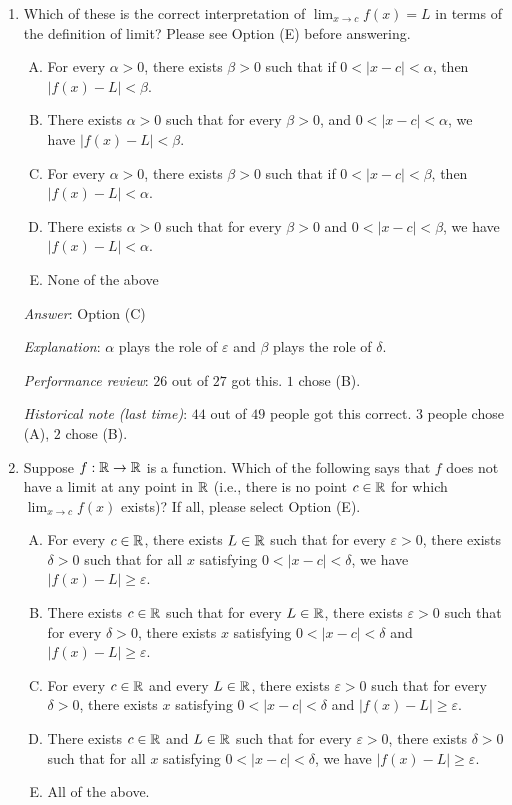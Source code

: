 \documentclass[10pt]{amsart}
\begin{document}
\begin{enumerate}
\item Which of these is the correct interpretation of $\displaystyle
  \lim_{x \to c} f(x) = L$ in terms of the definition of limit? Please
  see Option (E) before answering.

  \begin{enumerate}[(A)]
  \item For every $\alpha > 0$, there exists $\beta > 0$ such that if
    $0 < |x - c| < \alpha$, then $|f(x) - L| < \beta$.
  \item There exists $\alpha > 0$ such that for every $\beta > 0$, and
    $0 < |x - c| < \alpha$, we have $|f(x) - L| < \beta$.
  \item For every $\alpha > 0$, there exists $\beta > 0$ such that if
    $0 < |x - c| < \beta$, then $|f(x) - L| < \alpha$.
  \item There exists $\alpha > 0$ such that for every $\beta > 0$ and
    $0 < |x - c| < \beta$, we have $|f(x) - L| < \alpha$.
  \item None of the above
  \end{enumerate}

  {\em Answer}: Option (C)

  {\em Explanation}: $\alpha$ plays the role of $\varepsilon$ and $\beta$
  plays the role of $\delta$.

  {\em Performance review}: $26$ out of $27$ got this. $1$ chose (B).

  {\em Historical note (last time)}: $44$ out of $49$ people got this
  correct. $3$ people chose (A), $2$ chose (B).

\item Suppose $f:\mathbb{R} \to \mathbb{R}$ is a function. Which of the following says
  that $f$ does not have a limit at any point in $\mathbb{R}$ (i.e., there is
  no point $c \in \mathbb{R}$ for which $\displaystyle \lim_{x \to c} f(x)$
  exists)? If all, please select Option (E).

  \begin{enumerate}[(A)]
  \item For every $c \in \mathbb{R}$, there exists $L \in \mathbb{R}$ such that for
    every $\varepsilon > 0$, there exists $\delta > 0$ such that for all
    $x$ satisfying $0 < |x - c| < \delta$, we have $|f(x) - L| \ge
    \varepsilon$.
  \item There exists $c \in \mathbb{R}$ such that for every $L \in \mathbb{R}$, there
    exists $\varepsilon > 0$ such that for every $\delta > 0$, there exists
    $x$ satisfying $0 < |x - c| < \delta$ and $|f(x) - L| \ge \varepsilon$.
  \item For every $c \in \mathbb{R}$ and every $L \in \mathbb{R}$, there exists
    $\varepsilon > 0$ such that for every $\delta > 0$, there exists $x$
    satisfying $0 < |x - c| < \delta$ and $|f(x) - L| \ge \varepsilon$.
  \item There exists $c \in \mathbb{R}$ and $L \in \mathbb{R}$ such that for
    every $\varepsilon > 0$, there exists $\delta > 0$ such that for all
    $x$ satisfying $0 < |x - c| < \delta$, we have $|f(x) - L| \ge
    \varepsilon$.
  \item All of the above.
  \end{enumerate}


\end{enumerate}
\end{document}
